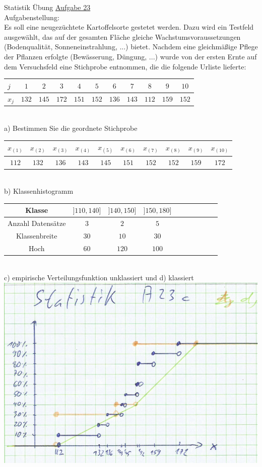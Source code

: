 \documentclass[12pt]{article} %
\newcommand{\aufgabe}[1]{{\huge Statistik Übung \underline{Aufgabe #1}}\\[3.5ex]  }
\begin{document}
\newpage
\aufgabe{23}
Aufgabenstellung: \\
Es soll eine neugezüchtete Kartoffelsorte gestetet werden. Dazu wird ein Testfeld ausgewählt, das auf der gesamten Fläche gleiche Wachstumsvoraussetzungen (Bodenqualität, Sonneneinstrahlung, ...) bietet. Nachdem eine gleichmäßige Pflege der Pflanzen erfolgte (Bewässerung, Düngung, ...) wurde von der ersten Ernte auf dem Versuchsfeld eine Stichprobe entnommen, die die folgende Urliste lieferte: \\
\begin{tabular}{| l || c | c | c | c | c | c | c | c | c | c |}
\hline
$j$ & $1$ & $2$ & $3$ & $4$ & $5$ & $6$ & $7$ & $8$ & $9$ & $10$ \\ \hline
$x_j$ & $132$ & $145$ & $172$ & $151$ & $152$ & $136$ & $143$ & $112$ & $159$ & $152$ \\ \hline
\end{tabular}\\[0.4cm]
a) Bestimmen Sie die geordnete Stichprobe\\
\begin{tabular}{| c | c | c | c | c | c | c | c | c | c |}
\hline
$x_{(1)}$ & $x_{(2)}$ & $x_{(3)}$ & $x_{(4)}$ & $x_{(5)}$ & $x_{(6)}$ & $x_{(7)}$ & $x_{(8)}$ & $x_{(9)}$ & $x_{(10)}$ \\ \hline
$112$ & $132$ & $136$ & $143$ & $145$ & $151$ & $152$ & $152$ & $159$ & $172$ \\ \hline
\end{tabular}\\[0.4cm]
b) Klassenhistogramm\\
\begin{tabular}{| c | c | c | c | c | c | c | c | c | c |}
\hline
Klasse                       & $]110, 140]$ & $]140, 150]$ & $]150, 180]$ \\ \hline
Anzahl Datensätze   & $3$ & $2$ & $5$ \\ \hline
Klassenbreite            & $30$ & $10$ & $30$ \\ \hline
Hoch                         & $60$ & $120$ & $100$ \\ \hline
\end{tabular}\\[0.4cm]
c) empirische Verteilungsfunktion unklassiert und d) klassiert \\
\includegraphics{A23c.pdf} \\[0.4cm]
\end{document}
